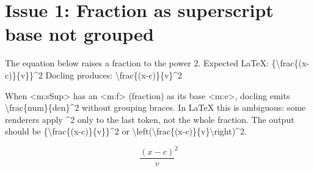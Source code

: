 \documentclass[11pt,a4paper]{article}
\begin{document}
\section{\textbf{Issue 1: Fraction as superscript base not grouped}}

The equation below raises a fraction to the power 2.
Expected LaTeX: \{\textbackslash{}frac\{(x-c)\}\{v\}\}\textasciicircum{}2
Docling produces: \textbackslash{}frac\{(x-c)\}\{v\}\textasciicircum{}2

When <m:sSup> has an <m:f> (fraction) as its base <m:e>, docling emits
\textbackslash{}frac\{num\}\{den\}\textasciicircum{}2 without grouping braces. In LaTeX this is ambiguous:
some renderers apply \textasciicircum{}2 only to the last token, not the whole fraction.
The output should be \{\textbackslash{}frac\{(x-c)\}\{v\}\}\textasciicircum{}2 or \textbackslash{}left(\textbackslash{}frac\{(x-c)\}\{v\}\textbackslash{}right)\textasciicircum{}2.

$${\frac{(x-c)}{v}}^{2}$$
\end{document}
